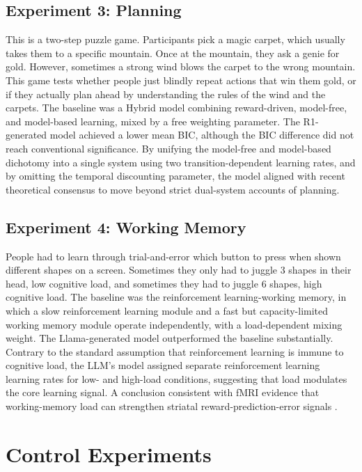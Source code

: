 \subsection{Experiment 3: Planning}

This is a two-step puzzle game. Participants pick a magic carpet, which usually takes them to a specific mountain. Once at the mountain, they ask a genie for gold. However, sometimes a strong wind blows the carpet to the wrong mountain. This game tests whether people just blindly repeat actions that win them gold, or if they actually plan ahead by understanding the rules of the wind and the carpets. The baseline was a Hybrid model combining reward-driven, model-free, and model-based learning, mixed by a free weighting parameter. The R1-generated model achieved a lower mean BIC, although the BIC difference did not reach conventional significance. By unifying the model-free and model-based dichotomy into a single system using two transition-dependent learning rates, and by omitting the temporal discounting parameter, the model aligned with recent theoretical consensus to move beyond strict dual-system accounts of planning.

\subsection{Experiment 4: Working Memory}

People had to learn through trial-and-error which button to press when shown different shapes on a screen. Sometimes they only had to juggle 3 shapes in their head, low cognitive load, and sometimes they had to juggle 6 shapes, high cognitive load. The baseline was the reinforcement learning-working memory, in which a slow reinforcement learning module and a fast but capacity-limited working memory module operate independently, with a load-dependent mixing weight. The Llama-generated model outperformed the baseline substantially. Contrary to the standard assumption that reinforcement learning is immune to cognitive load, the LLM's model assigned separate reinforcement learning learning rates for low- and high-load conditions, suggesting that load modulates the core learning signal. A conclusion consistent with fMRI evidence that working-memory load can strengthen striatal reward-prediction-error signals \citep{collins2017workingmemory}.

\section{Control Experiments}

